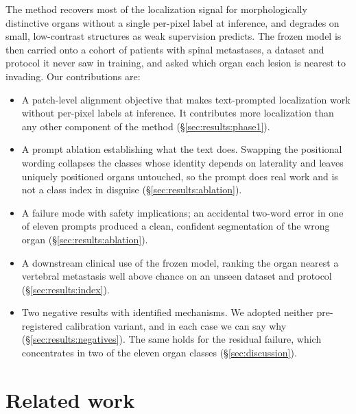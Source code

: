\documentclass[10pt]{article}
\begin{document}
The method recovers most of the localization signal for morphologically
distinctive organs without a single per-pixel label at inference, and degrades on
small, low-contrast structures as weak supervision predicts. The frozen model is
then carried onto a cohort of patients with spinal metastases, a dataset and
protocol it never saw in training, and asked which organ each lesion is nearest to
invading. Our contributions are:

\begin{itemize}[leftmargin=1.3em,itemsep=1pt,topsep=2pt]
\item A patch-level alignment objective that makes text-prompted localization
work without per-pixel labels at inference. It contributes more localization than
any other component of the method (\S\ref{sec:results:phase1}).
\item A prompt ablation establishing what the text does. Swapping the positional
wording collapses the classes whose identity depends on laterality and leaves
uniquely positioned organs untouched, so the prompt does real work and is not a
class index in disguise (\S\ref{sec:results:ablation}).
\item A failure mode with safety implications; an accidental two-word error in one
of eleven prompts produced a clean, confident segmentation of the wrong organ
(\S\ref{sec:results:ablation}).
\item A downstream clinical use of the frozen model, ranking the organ nearest a
vertebral metastasis well above chance on an unseen dataset and protocol
(\S\ref{sec:results:index}).
\item Two negative results with identified mechanisms. We adopted neither
pre-registered calibration variant, and in each case we can say why
(\S\ref{sec:results:negatives}). The same holds for the residual failure, which
concentrates in two of the eleven organ classes (\S\ref{sec:discussion}).
\end{itemize}

\section{Related work}
\label{sec:related}
\end{document}
